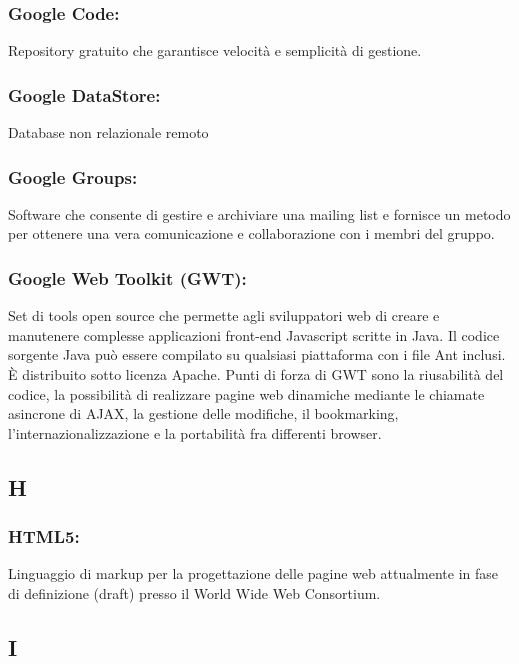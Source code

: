 \subsubsection*{Google Code:} Repository gratuito che garantisce
velocit\`a e semplicit\`a di gestione.

\subsubsection*{Google DataStore:} Database non relazionale remoto

\subsubsection*{Google Groups:} Software che consente di gestire e archiviare
una mailing list e fornisce un metodo per ottenere una vera comunicazione e
collaborazione con i membri del gruppo.

\subsubsection*{Google Web Toolkit (GWT):} Set di tools open source che
permette agli sviluppatori web di creare e manutenere complesse applicazioni front-end
Javascript scritte in Java. Il codice sorgente Java pu\`o essere compilato su
qualsiasi piattaforma con i file Ant inclusi. \`E distribuito sotto licenza
Apache. Punti di forza di GWT sono la riusabilit\`a del codice, la possibilit\`a di
realizzare pagine web dinamiche mediante le chiamate asincrone di AJAX, la
gestione delle modifiche, il bookmarking, l'internazionalizzazione e la
portabilit\`a fra differenti browser.

\subsection*{\huge{H}}
\subsubsection*{HTML5:} Linguaggio di markup per la progettazione delle pagine
web attualmente in fase di definizione (draft) presso il World Wide Web Consortium.

\subsection*{\huge{I}}
